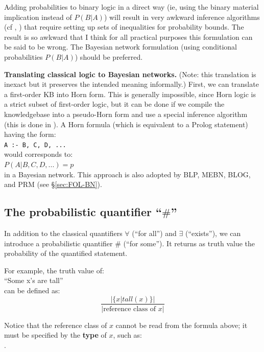 Adding probabilities to binary logic in a direct way (ie, using the binary material implication instead of $P(B|A)$) will result in very awkward inference algorithms (cf \citep*{Ng1992}, \citep*{Nilsson1986}) that require setting up sets of inequalities for probability bounds.  The result is so awkward that I think for all practical purposes this formulation can be said to be wrong.  The Bayesian network formulation (using conditional probabilities $P(B|A)$) should be preferred.

\textbf{Translating classical logic to Bayesian networks.}  (Note:  this translation is inexact but it preserves the intended meaning informally.)  First, we can translate a first-order KB into Horn form.  This is generally impossible, since Horn logic is a strict subset of first-order logic, but it can be done if we compile the knowledgebase into a pseudo-Horn form and use a special inference algorithm (this is done in \citep*{Stickel1988}).  A Horn formula (which is equivalent to a Prolog statement) having the form:\\
\hspace*{1cm} \texttt{A :- B, C, D, ...}\\
would corresponds to:\\
\hspace*{1cm} $ P(A | B, C, D, ...) = p $\\
in a Bayesian network.  This approach is also adopted by BLP, MEBN, BLOG, and PRM (see \S\ref{sec:FOL-BN}).

\subsection{The probabilistic quantifier ``$\#$''}
\label{sec:probabilistic-quantifier}

In addition to the classical quantifiers $\forall$ (``for all'') and $\exists$ (``exists''), we can introduce a probabilistic quantifier $\#$ (``for some'').  It returns as truth value the probability of the quantified statement.

For example, the truth value of:\\
\hspace*{1cm}  \hspace*{5cm} ``Some x's are tall''\\
can be defined as:\\
$$ \frac{|\{ x | tall(x) \}|}{| \mbox{reference class of } x |} $$

Notice that the reference class of $x$ cannot be read from the formula above; it must be specified by the \textbf{type} of $x$, such as:\\
\hspace*{1cm} .

